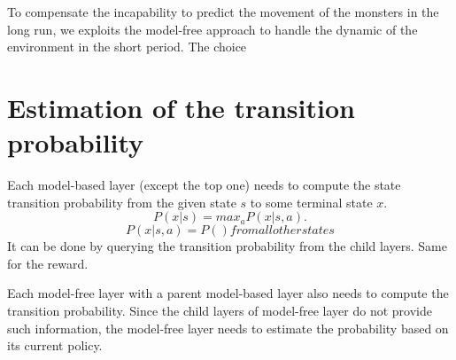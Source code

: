 To compensate the incapability to predict the movement of the monsters in the long run, 
we exploits the model-free approach to handle the dynamic of the environment in the short period.
The choice

\section{Estimation of the transition probability}

Each model-based layer (except the top one) needs to compute the state transition probability
from the given state $s$ to some terminal state $x$.
\begin{equation}
    P(x|s) = max_a P(x|s, a).
\end{equation}
\begin{equation}
    P(x|s, a) = P() from all other states
\end{equation}
It can be done by querying the transition probability from the child layers.
Same for the reward.

Each model-free layer with a parent model-based layer also needs to compute the transition probability.
Since the child layers of model-free layer do not provide such information, the model-free layer
needs to estimate the probability based on its current policy.




